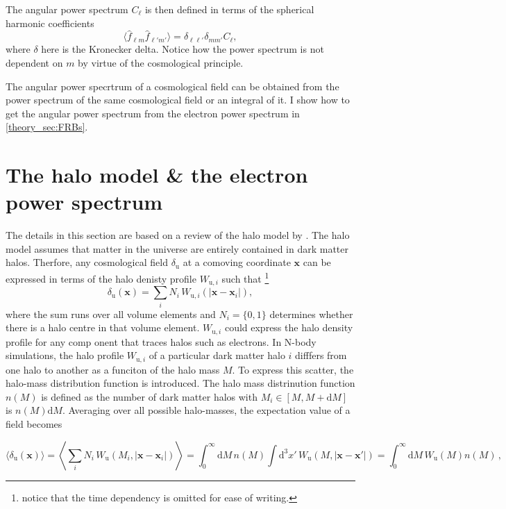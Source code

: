 The angular power spectrum $C_\ell$ is then defined in terms of the spherical harmonic coefficients 
\begin{equation} \label{eq:ang_power_spectrum}
    \langle \hat{f}_{\ell m} \hat{f}_{\ell' m'}\rangle = \delta_{\ell \ell'} \delta_{m m'}C_{\ell},
\end{equation}
where $\delta$ here is the Kronecker delta. Notice how the power spectrum is not dependent on $m$ by virtue of the cosmological principle. 

The angular power specrtrum of a cosmological field can be obtained from the power spectrum of the same cosmological field or an integral of it. I show how to get the angular power spectrum from the electron power spectrum in \ref{theory_sec:FRBs}.
 


\section{The halo model \& the electron power spectrum} \label{theory_sec:halo_model}
The details in this section are based on a review of the halo model by \citet{asgari2023halo}. The halo model assumes that matter in the universe are entirely contained in dark matter halos. Therfore, any cosmological field $\delta_{\mathrm{u}}$ at a comoving coordinate $\mathbf{x}$ can be expressed in terms of the halo denisty profile $W_{\mathrm{u},i}$ such that \footnote{notice that the time dependency is omitted for ease of writing.}
\begin{equation}
    \delta_{\mathrm{u}}(\mathbf{x}) = \sum_{i} N_i \, W_{\mathrm{u},i}\!\left(\left|\mathbf{x} - \mathbf{x}_i\right|\right),
\end{equation}
where the sum runs over all volume elements and $N_i = \{0, 1\}$ determines whether there is a halo centre in that volume element. $W_{\mathrm{u},i}$ could express the halo density profile for any comp onent that traces halos such as electrons. In N-body simulations, the halo profile $W_{\mathrm{u},i}$ of a particular dark matter halo $i$ difffers from one halo to another as a funciton of the halo mass $M$. To express this scatter, the halo-mass distribution function is introduced. The halo mass distrinution function $n(M)$ is defined as the number of dark matter halos with $M_i \in [M, M + \mathrm{d} M]$ is $n(M)\mathrm{d}M$. Averaging over all possible halo-masses, the expectation value of a field becomes

\begin{equation}
    \langle \delta_{\mathrm{u}}(\mathbf{x}) \rangle = \left\langle \sum_{i} N_i \, W_{\mathrm{u}}(M_i, |\mathbf{x} - \mathbf{x}_i|) \right\rangle = \int_0^{\infty} \mathrm{d}M \, n(M) \int \mathrm{d}^3x' \, W_{\mathrm{u}}(M, |\mathbf{x} - \mathbf{x}'|) = \int_0^{\infty} \mathrm{d}M \, W_{\mathrm{u}}(M) n(M) \, ,
\end{equation}

